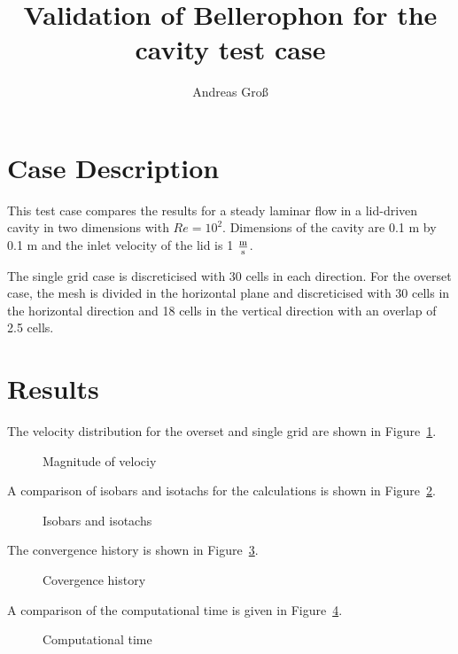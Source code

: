 \documentclass[a4paper,10pt]{scrartcl}
\title{Validation of Bellerophon for the cavity test case}
\author{Andreas Groß}
\begin{document}
\maketitle

\section{Case Description}
This test case compares the results for a steady laminar flow in a lid-driven
cavity in two dimensions with \(Re=10^2\). Dimensions of the cavity are 0.1 m
by 0.1 m and the inlet velocity of the lid is 1 \(\frac{\text m}{\text s}\).

The single grid case is discreticised with 30 cells in each direction. For the
overset case, the mesh is divided in the horizontal plane and discreticised with
30 cells in the horizontal direction and 18 cells in the vertical direction with
an overlap of 2.5 cells.

\section{Results}

The velocity distribution for the overset and single grid are shown in
Figure~\ref{U}.
\begin{figure}[!htbp]
  \centering
  \resizebox{0.49\columnwidth}{!}{}
  \resizebox{0.49\columnwidth}{!}{}
  \caption{Magnitude of velociy}
  \label{U}
\end{figure}

A comparison of isobars and isotachs for the calculations is shown in
Figure~\ref{iso}.
\begin{figure}[!htbp]
  \centering
  \resizebox{0.49\columnwidth}{!}{}
  \resizebox{0.49\columnwidth}{!}{}
  \caption{Isobars and isotachs}
  \label{iso}
\end{figure}

The convergence history is shown in Figure~\ref{residuals}.
\begin{figure}[!htbp]
  \centering
  \resizebox{0.49\columnwidth}{!}{}
  \caption{Covergence history}
  \label{residuals}
\end{figure}

A comparison of the computational time is given in Figure~\ref{t}.
\begin{figure}[!htbp]
  \centering
  \resizebox{0.49\columnwidth}{!}{}
  \caption{Computational time}
  \label{t}
\end{figure}
\end{document}
